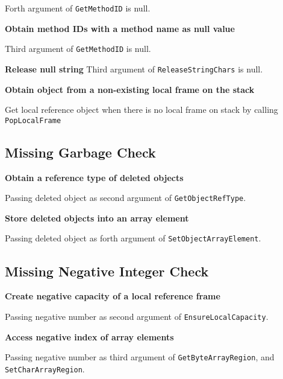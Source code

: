 \documentclass[10pt]{article}
\begin{document}
Forth argument of {\tt GetMethodID} is null.

\vspace{3mm}
\noindent \textbf{Obtain method IDs  with a method name as null value}

Third argument of {\tt GetMethodID} is null.

\vspace{3mm}
\noindent \textbf{Release null string}
Third argument of {\tt ReleaseStringChars} is null.

\vspace{3mm}
\noindent \textbf{Obtain object from a non-existing local frame on the stack}

Get local reference object when there is no local frame on stack by calling {\tt PopLocalFrame}

\subsection{Missing Garbage Check}
\vspace{3mm}
\noindent \textbf{Obtain a reference type of deleted objects}

Passing deleted object as second argument of {\tt GetObjectRefType}.

\vspace{3mm}
\noindent \textbf{Store deleted objects into an array element}

Passing deleted object as forth argument of {\tt SetObjectArrayElement}.


\subsection{Missing Negative Integer Check}

\vspace{3mm}
\noindent \textbf{Create negative capacity of a local reference frame}

Passing negative number as second argument of {\tt EnsureLocalCapacity}.

\vspace{3mm}
\noindent \textbf{Access negative index of array elements}

Passing negative number as third argument of {\tt GetByteArrayRegion}, and {\tt SetCharArrayRegion}.
\end{document}
